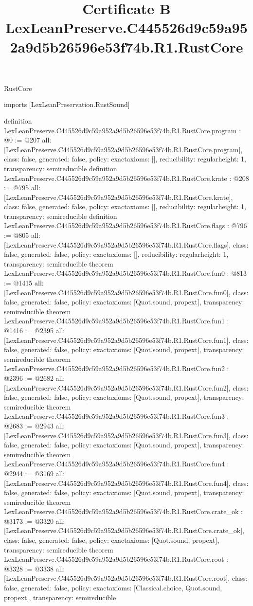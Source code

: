 \begin{lexlean}{RustCore}
\title{Certificate B LexLeanPreserve.C445526d9c59a952a9d5b26596e53f74b.R1.RustCore}
\begin{coremodule}
imports [LexLeanPreservation.RustSound]

definition LexLeanPreserve.C445526d9c59a952a9d5b26596e53f74b.R1.RustCore.program : @0 := @207 {
  all: [LexLeanPreserve.C445526d9c59a952a9d5b26596e53f74b.R1.RustCore.program],
  class: false,
  generated: false,
  policy: exact{axioms: []},
  reducibility: regular{height: 1},
  transparency: semireducible
}
definition LexLeanPreserve.C445526d9c59a952a9d5b26596e53f74b.R1.RustCore.krate : @208 := @795 {
  all: [LexLeanPreserve.C445526d9c59a952a9d5b26596e53f74b.R1.RustCore.krate],
  class: false,
  generated: false,
  policy: exact{axioms: []},
  reducibility: regular{height: 1},
  transparency: semireducible
}
definition LexLeanPreserve.C445526d9c59a952a9d5b26596e53f74b.R1.RustCore.flags : @796 := @805 {
  all: [LexLeanPreserve.C445526d9c59a952a9d5b26596e53f74b.R1.RustCore.flags],
  class: false,
  generated: false,
  policy: exact{axioms: []},
  reducibility: regular{height: 1},
  transparency: semireducible
}
theorem LexLeanPreserve.C445526d9c59a952a9d5b26596e53f74b.R1.RustCore.fun0 : @813 := @1415 {
  all: [LexLeanPreserve.C445526d9c59a952a9d5b26596e53f74b.R1.RustCore.fun0],
  class: false,
  generated: false,
  policy: exact{axioms: [Quot.sound, propext]},
  transparency: semireducible
}
theorem LexLeanPreserve.C445526d9c59a952a9d5b26596e53f74b.R1.RustCore.fun1 : @1416 := @2395 {
  all: [LexLeanPreserve.C445526d9c59a952a9d5b26596e53f74b.R1.RustCore.fun1],
  class: false,
  generated: false,
  policy: exact{axioms: [Quot.sound, propext]},
  transparency: semireducible
}
theorem LexLeanPreserve.C445526d9c59a952a9d5b26596e53f74b.R1.RustCore.fun2 : @2396 := @2682 {
  all: [LexLeanPreserve.C445526d9c59a952a9d5b26596e53f74b.R1.RustCore.fun2],
  class: false,
  generated: false,
  policy: exact{axioms: [Quot.sound, propext]},
  transparency: semireducible
}
theorem LexLeanPreserve.C445526d9c59a952a9d5b26596e53f74b.R1.RustCore.fun3 : @2683 := @2943 {
  all: [LexLeanPreserve.C445526d9c59a952a9d5b26596e53f74b.R1.RustCore.fun3],
  class: false,
  generated: false,
  policy: exact{axioms: [Quot.sound, propext]},
  transparency: semireducible
}
theorem LexLeanPreserve.C445526d9c59a952a9d5b26596e53f74b.R1.RustCore.fun4 : @2944 := @3169 {
  all: [LexLeanPreserve.C445526d9c59a952a9d5b26596e53f74b.R1.RustCore.fun4],
  class: false,
  generated: false,
  policy: exact{axioms: [Quot.sound, propext]},
  transparency: semireducible
}
theorem LexLeanPreserve.C445526d9c59a952a9d5b26596e53f74b.R1.RustCore.crate_ok : @3173 := @3320 {
  all: [LexLeanPreserve.C445526d9c59a952a9d5b26596e53f74b.R1.RustCore.crate_ok],
  class: false,
  generated: false,
  policy: exact{axioms: [Quot.sound, propext]},
  transparency: semireducible
}
theorem LexLeanPreserve.C445526d9c59a952a9d5b26596e53f74b.R1.RustCore.root : @3328 := @3338 {
  all: [LexLeanPreserve.C445526d9c59a952a9d5b26596e53f74b.R1.RustCore.root],
  class: false,
  generated: false,
  policy: exact{axioms: [Classical.choice, Quot.sound, propext]},
  transparency: semireducible
}


\end{coremodule}
\end{lexlean}
